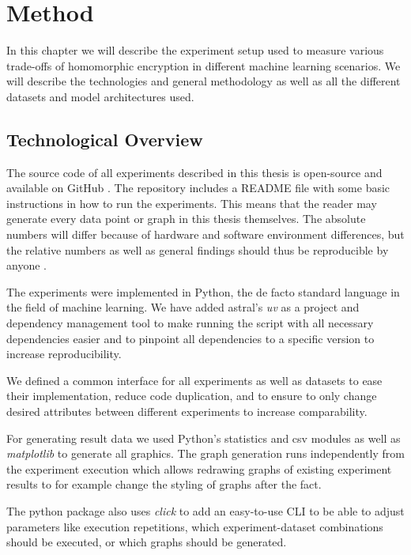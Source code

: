 \chapter{Method}

In this chapter we will describe the experiment setup used to measure various trade-offs of homomorphic encryption in different machine learning scenarios. We will describe the technologies and general methodology as well as all the different datasets and model architectures used.

\section{Technological Overview}

The source code of all experiments described in this thesis is open-source and available on GitHub \cite{partanen_julianfpfhe-experiments_2025}. The repository includes a README file with some basic instructions in how to run the experiments. This means that the reader may generate every data point or graph in this thesis themselves. The absolute numbers will differ because of hardware and software environment differences, but the relative numbers as well as general findings should thus be reproducible by anyone .

The experiments were implemented in Python, the de facto standard language in the field of machine learning. We have added astral's \emph{uv} \cite{astral_uv_nodate} as a project and dependency management tool to make running the script with all necessary dependencies easier and to pinpoint all dependencies to a specific version to increase reproducibility.

We defined a common interface for all experiments as well as datasets to ease their implementation, reduce code duplication, and to ensure to only change desired attributes between different experiments to increase comparability.

For generating result data we used Python's statistics and csv modules as well as \emph{matplotlib} \cite{noauthor_matplotlib_nodate} to generate all graphics. The graph generation runs independently from the experiment execution which allows redrawing graphs of existing experiment results to for example change the styling of graphs after the fact.

The python package also uses \emph{click} \cite{pallets_welcome_nodate} to add an easy-to-use CLI to be able to adjust parameters like execution repetitions, which experiment-dataset combinations should be executed, or which graphs should be generated.

